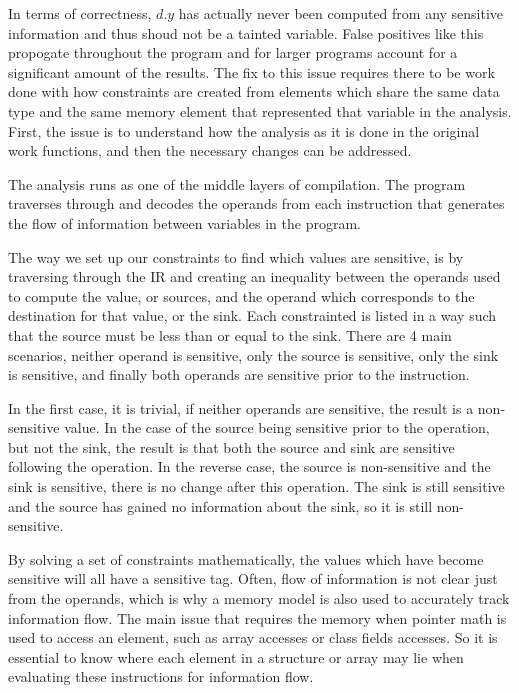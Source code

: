 \documentclass[11pt,a4paper]{article}
\begin{document}
  In terms of correctness, $d.y$ has actually never been computed from any
  sensitive information and thus shoud not be a tainted variable. False
  positives like this propogate throughout the program and for larger programs
  account for a significant amount of the results. The fix to this issue
  requires there to be work done with how constraints are created from elements
  which share the same data type and the same memory element that represented
  that variable in the analysis. First, the issue is to understand how the
  analysis as it is done in the original work functions, and then the necessary
  changes can be addressed.

  The analysis runs as one of the middle layers of compilation. The program
  traverses through and decodes the operands from each instruction that
  generates the flow of information between variables in the program.

  The way we set up our constraints to find which values are sensitive, is by
  traversing through the IR and creating an inequality between the operands used
  to compute the value, or sources, and the operand which corresponds to the
  destination for that value, or the sink. Each constrainted is listed in a way
  such that the source must be less than or equal to the sink. There are 4 main
  scenarios, neither operand is sensitive, only the source is sensitive, only
  the sink is sensitive, and finally both operands are sensitive prior to the
  instruction.

  In the first case, it is trivial, if neither operands are sensitive, the
  result is a non-sensitive value. In the case of the source being sensitive
  prior to the operation, but not the sink, the result is that both the source
  and sink are sensitive following the operation. In the reverse case, the
  source is non-sensitive and the sink is sensitive, there is no change after
  this operation. The sink is still sensitive and the source has gained no
  information about the sink, so it is still non-sensitive.

  By solving a set of constraints mathematically, the values which have become
  sensitive will all have a sensitive tag. Often, flow of information is not
  clear just from the operands, which is why a memory model is also used to
  accurately track information flow. The main issue that requires the memory
  when pointer math is used to access an element, such as array accesses or
  class fields accesses. So it is essential to know where each element in a
  structure or array may lie when evaluating these instructions for information
  flow.
\end{document}
